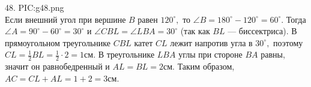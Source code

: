 48. {{PIC:g48.png}}\\
Если внешний угол при вершине $B$ равен $120^\circ,$ то $\angle B=180^\circ-120^\circ=60^\circ.$ Тогда $\angle A=90^\circ-60^\circ=30^\circ$ и $\angle CBL=\angle LBA=30^\circ$ (так как $BL$ --- биссектриса). В прямоугольном треугольнике $CBL$ катет $CL$ лежит напротив угла в $30^\circ,$ поэтому $CL=\frac{1}{2}BL=\frac{1}{2}\cdot2=1$см. В треугольнике $LBA$ углы при стороне $BA$ равны, значит он равнобедренный и $AL=BL=2$см. Таким образом, $AC=CL+AL=1+2=3$см.\\
